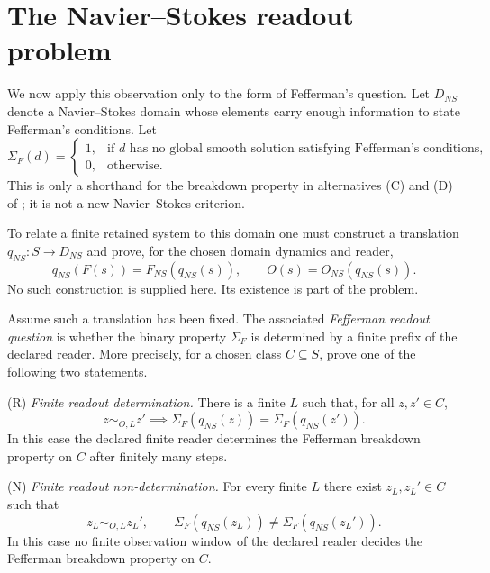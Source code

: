 \documentclass[11pt]{article}
\theoremstyle{plain}
\theoremstyle{definition}
\begin{document}
\section{The Navier--Stokes readout problem}

We now apply this observation only to the form of Fefferman's question. Let $D_{NS}$ denote a
Navier--Stokes domain whose elements carry enough information to state Fefferman's conditions. Let
\begin{equation}
  \Sigma_F(d) = \begin{cases} 1, & \text{if } d \text{ has no global smooth solution satisfying Fefferman's conditions}, \\ 0, & \text{otherwise.} \end{cases}
\end{equation}
This is only a shorthand for the breakdown property in alternatives (C) and (D) of
\cite{fefferman2006}; it is not a new Navier--Stokes criterion.

To relate a finite retained system to this domain one must construct a translation
$q_{NS}: S \to D_{NS}$ and prove, for the chosen domain dynamics and reader,
\begin{equation}
  q_{NS}(F(s)) = F_{NS}(q_{NS}(s)), \qquad O(s) = O_{NS}(q_{NS}(s)). \label{eq:nsweld}
\end{equation}
No such construction is supplied here. Its existence is part of the problem.

Assume such a translation has been fixed. The associated \emph{Fefferman readout question} is
whether the binary property $\Sigma_F$ is determined by a finite prefix of the declared reader.
More precisely, for a chosen class $C\subseteq S$, prove one of the following two statements.

\smallskip
\noindent(R) \emph{Finite readout determination.} There is a finite $L$ such that, for all
$z,z'\in C$,
\begin{equation}
  z\sim_{O,L} z' \implies \Sigma_F(q_{NS}(z)) = \Sigma_F(q_{NS}(z')). \label{eq:R}
\end{equation}
In this case the declared finite reader determines the Fefferman breakdown property on $C$ after
finitely many steps.

\smallskip
\noindent(N) \emph{Finite readout non-determination.} For every finite $L$ there exist
$z_L,z_L'\in C$ such that
\begin{equation}
  z_L \sim_{O,L} z_L', \qquad \Sigma_F(q_{NS}(z_L)) \ne \Sigma_F(q_{NS}(z_L')). \label{eq:N}
\end{equation}
In this case no finite observation window of the declared reader decides the Fefferman breakdown
property on $C$.
\end{document}
